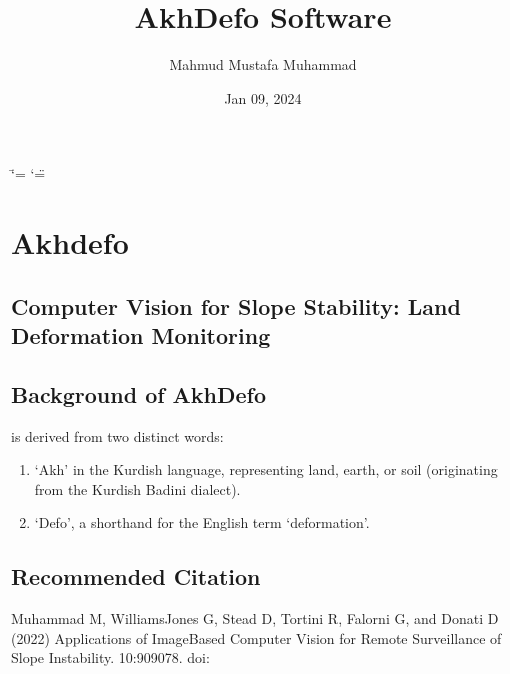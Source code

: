 \documentclass[letterpaper,10pt,english]{sphinxmanual}
\title{AkhDefo Software}
\date{Jan 09, 2024}
\author{Mahmud Mustafa Muhammad}
\let\sphinxpxdimen\pdfpxdimen\else\newdimen\sphinxpxdimen
\begin{document}
\ifdefined\shorthandoff
  \ifnum\catcode`\=\string=\active\shorthandoff{=}\fi
  \ifnum\catcode`\"=\active{}\fi
\fi

\pagestyle{empty}
\sphinxmaketitle
\pagestyle{plain}
\sphinxtableofcontents
\pagestyle{normal}
\label{\detokenize{index::doc}}


\noindent{\hspace*{\fill}\sphinxincludegraphics[width=200\sphinxpxdimen]{{akhdefo_logo}.svg}}

\sphinxstepscope


\chapter{Akhdefo}
\label{\detokenize{README:akhdefo}}\label{\detokenize{README::doc}}



\section{Computer Vision for Slope Stability: Land Deformation Monitoring}
\label{\detokenize{README:computer-vision-for-slope-stability-land-deformation-monitoring}}

\section{Background of Akh\sphinxhyphen{}Defo}
\label{\detokenize{README:background-of-akh-defo}}
\sphinxAtStartPar
{} is derived from two distinct words:
\begin{enumerate}
%
\item {} 
\sphinxAtStartPar
‘Akh’ in the Kurdish language, representing land, earth, or soil (originating from the Kurdish Badini dialect).

\item {} 
\sphinxAtStartPar
‘Defo’, a shorthand for the English term ‘deformation’.

\end{enumerate}


\section{Recommended Citation}
\label{\detokenize{README:recommended-citation}}
\sphinxAtStartPar
Muhammad M, Williams\sphinxhyphen{}Jones G, Stead D, Tortini R, Falorni G, and Donati D (2022) Applications of Image\sphinxhyphen{}Based Computer Vision for Remote Surveillance of Slope Instability.  10:909078. doi: 
\end{document}
